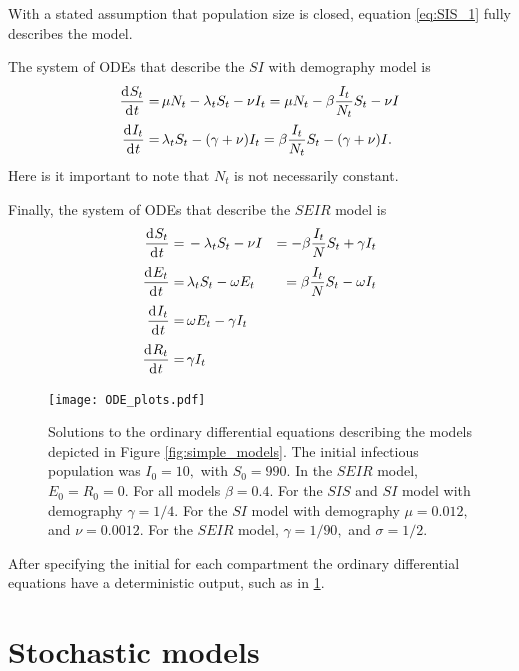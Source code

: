 With a stated assumption that population size is closed, equation \ref{eq:SIS_1} fully describes the model.

The system of ODEs that describe the $SI$ with demography model is \begin{align}
    \frac{\diff S_t}{\diff t} = & \, \mu N_t - \lambda_t S_t - \nu I_t = \mu N_t -\beta \frac{I_t}{N_t}S_t - \nu I \label{eq:SI_1}   \\
    \frac{\diff I_t}{\diff t} = & \, \lambda_t S_t - (\gamma + \nu)I_t = \beta \frac{I_t}{N_t}S_t - (\gamma + \nu) I\label{eq:SI_2}.
\end{align} Here is it important to note that $N_t$ is not necessarily constant.

Finally, the system of ODEs that describe the $SEIR$ model is \begin{align}
    \frac{\diff S_t}{\diff t} = & \, - \lambda_t S_t - \nu I                   & = -\beta \frac{I_t}{N}S_t + \gamma I_t \label{eq:SEIR_1} \\
    \frac{\diff E_t}{\diff t} = & \, \lambda_t S_t - \omega E_t                & = \beta \frac{I_t}{N}S_t - \omega I_t \label{eq:SEIR_2}  \\
    \frac{\diff I_t}{\diff t} = & \, \omega E_t - \gamma I_t \label{eq:SEIR_3}                                                            \\
    \frac{\diff R_t}{\diff t} = & \, \gamma I_t \label{eq:SEIR_4}
\end{align}

\begin{figure}[htbp]
    \centering
    \texttt{[image: ODE\_plots.pdf]}
    \caption{
        Solutions to the ordinary differential equations describing the models 
        depicted in Figure \ref{fig:simple_models}. The initial infectious 
        population was $I_0 = 10,$ with $S_0 = 990.$ In the $SEIR$ model, 
        $E_0 = R_0 = 0.$ For all models $\beta = 0.4.$ For the $SIS$ and $SI$
         model with demography $\gamma = 1/4.$ For the $SI$ model with 
         demography $\mu = 0.012,$ and $\nu = 0.0012.$ For the $SEIR$ model, 
         $\gamma = 1/90,$ and $\sigma = 1/2.$
    }
         \label{fig:ODE_outputs}
\end{figure}

After specifying the initial for each compartment the ordinary differential equations have a deterministic output, such as in \ref{fig:ODE_outputs}.

\section{Stochastic models}


